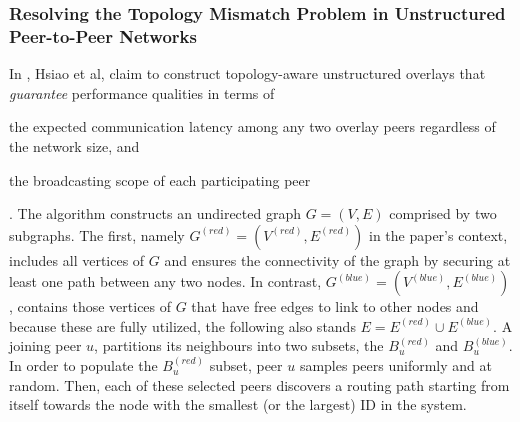 \subsubsection{Resolving the Topology Mismatch Problem in Unstructured
Peer-to-Peer Networks}

In \cite{hsiao_redblue_2009}, Hsiao et al, claim to construct topology-aware
unstructured overlays that \emph{guarantee} performance qualities in terms of
\begin{inparaenum}
  \item the expected communication latency among any two overlay peers
regardless of the network size, and
  \item the broadcasting scope of each participating peer
\end{inparaenum}
. The algorithm constructs an undirected graph $G = \left( V, E \right)$
comprised by two subgraphs. The first, namely $G^{\left( red \right)} = \left(
V^{\left( red \right)}, E^{\left( red \right)} \right)$ in the paper's context,
includes all vertices of $G$ and ensures the connectivity of the graph by
securing at least one path between any two nodes. In contrast, $G^{\left( blue
\right)} = \left( V^{\left( blue \right)}, E^{\left( blue \right)} \right)$,
contains those vertices of $G$ that have free edges to link to other nodes and
because these are fully utilized, the following also stands $E = E^{\left( red
\right)} \cup E^{\left( blue \right)}$. A joining peer $u$, partitions its
neighbours into two subsets, the $B_u^{\left( red \right)}$ and $B_u^{\left(
blue \right)}$. In order to populate the $B_u^{\left( red \right)}$ subset, peer
$u$ samples peers uniformly and at random. Then, each of these selected peers
discovers a routing path starting from itself towards the node with the smallest
(or the largest) ID in the system.

